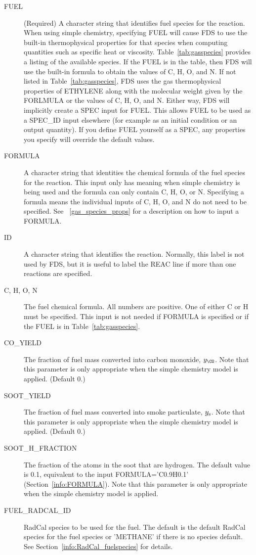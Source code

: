 \documentclass[11pt]{book}
\begin{document}
\begin{description}
\item[{\ct FUEL}] (Required) A character string that identifies fuel species for the reaction. When using simple chemistry, specifying {\ct FUEL} will
cause FDS to use the built-in thermophysical properties for that species when computing quantities such as specific heat or viscosity.
Table~\ref{tab:gasspecies} provides a listing of the available species.
If the {\ct FUEL} is in the table, then FDS will use the built-in formula to obtain the values of C, H, O, and N.
If not listed in Table~\ref{tab:gasspecies}, FDS uses the gas thermophysical properties of {\ct ETHYLENE} along with the molecular weight given by the {\ct FORLMULA} or the values of C, H, O, and N.  Either way, FDS will implicitly create a {\ct SPEC} input for {\ct FUEL}.  This allows {\ct FUEL} to be used as a {\ct SPEC\_ID} input elsewhere (for example as an initial condition or an output quantity).  If you define {\ct FUEL} yourself as a {\ct SPEC}, any properties you specify will override the default values.
\item[{\ct FORMULA}] A character string that identities the chemical formula of the fuel species for the reaction.
This input only has meaning when simple chemistry is being used and the formula can only contain C, H, O, or N.
Specifying a formula means the individual inputs of C, H, O, and N do not need to be specified. See ~\ref{gas_species_props} for a description on how to input a {\ct FORMULA}.
\item[{\ct ID}] A character string that identifies the reaction. Normally, this label is not used by FDS, but it is useful to
label the {\ct REAC} line if more than one reactions are specified.
\item[{\ct C, H, O, N}] The fuel chemical formula. All numbers are positive.  One of either {\ct C} or {\ct H} must be specified.
This input is not needed if {\ct FORMULA} is specified or if the {\ct FUEL} is in Table~\ref{tab:gasspecies}.
\item[{\ct CO\_YIELD}] The fraction of fuel mass converted into carbon monoxide, $y_{\CO}$. Note that this parameter is only appropriate when the
simple chemistry model is applied. (Default 0.)
\item[{\ct SOOT\_YIELD}] The fraction of fuel mass converted into smoke particulate, $y_{\rm s}$.
Note that this parameter is only appropriate when the simple chemistry model is applied.  (Default 0.)
\item[{\ct SOOT\_H\_FRACTION}] The fraction of the atoms in the soot that are hydrogen.  The default value is 0.1, equivalent to the input {\ct FORMULA='C0.9H0.1'} (Section~\ref{info:FORMULA}). Note that this parameter is only appropriate when the simple chemistry model is applied.
\item[{\ct FUEL\_RADCAL\_ID}] RadCal species to be used for the fuel.  The default is the default RadCal species for the fuel species or {\ct 'METHANE'} if there is no species default. See Section~\ref{info:RadCal_fuelspecies} for details.
\end{description}
\end{document}
